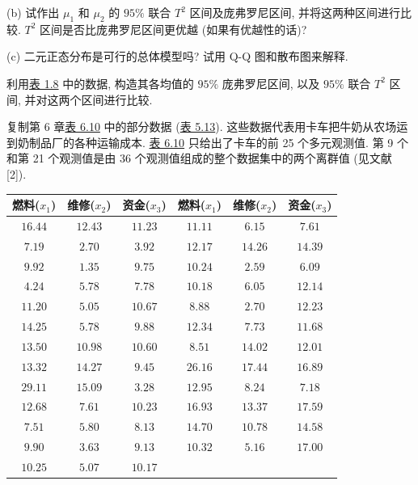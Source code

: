 \noindent (b) 试作出 $\mu_{1}$ 和 $\mu_{2}$ 的 $95\%$ 联合 $T^{2}$ 区间及庞弗罗尼区间, 并将这两种区间进行比较. $T^{2}$ 区间是否比庞弗罗尼区间更优越 (如果有优越性的话)?

\noindent (c) 二元正态分布是可行的总体模型吗? 试用 Q-Q 图和散布图来解释.

\medskip
\noindent{}\quad 利用\hyperref[tab:1.8]{表 1.8} 中的数据, 构造其各均值的 $95\%$ 庞弗罗尼区间, 以及 $95\%$ 联合 $T^{2}$ 区间, 并对这两个区间进行比较.

\medskip
\noindent{}\quad 复制第 6 章\hyperref[tab:6.10]{表 6.10} 中的部分数据 (\hyperref[tab:5.13]{表 5.13}). 这些数据代表用卡车把牛奶从农场运到奶制品厂的各种运输成本. \hyperref[tab:6.10]{表 6.10} 只给出了卡车的前 25 个多元观测值. 第 9 个和第 21 个观测值是由 36 个观测值组成的整个数据集中的两个离群值 (见文献 [2]).

\begin{mvtable}
\label{tab:5.13}
\centering
{\small
\begin{tabular}{|c|c|c||c|c|c|}
\hline
燃料($x_{1}$) & 维修($x_{2}$) & 资金($x_{3}$) & 燃料($x_{1}$) & 维修($x_{2}$) & 资金($x_{3}$)\\
\hline
$16.44$ & $12.43$ & $11.23$ & $11.11$ & $6.15$ & $7.61$\\
$7.19$ & $2.70$ & $3.92$ & $12.17$ & $14.26$ & $14.39$\\
$9.92$ & $1.35$ & $9.75$ & $10.24$ & $2.59$ & $6.09$\\
$4.24$ & $5.78$ & $7.78$ & $10.18$ & $6.05$ & $12.14$\\
$11.20$ & $5.05$ & $10.67$ & $8.88$ & $2.70$ & $12.23$\\
$14.25$ & $5.78$ & $9.88$ & $12.34$ & $7.73$ & $11.68$\\
$13.50$ & $10.98$ & $10.60$ & $8.51$ & $14.02$ & $12.01$\\
$13.32$ & $14.27$ & $9.45$ & $26.16$ & $17.44$ & $16.89$\\
$29.11$ & $15.09$ & $3.28$ & $12.95$ & $8.24$ & $7.18$\\
$12.68$ & $7.61$ & $10.23$ & $16.93$ & $13.37$ & $17.59$\\
$7.51$ & $5.80$ & $8.13$ & $14.70$ & $10.78$ & $14.58$\\
$9.90$ & $3.63$ & $9.13$ & $10.32$ & $5.16$ & $17.00$\\
$10.25$ & $5.07$ & $10.17$ & & &\\
\hline
\end{tabular}}
\end{mvtable}

